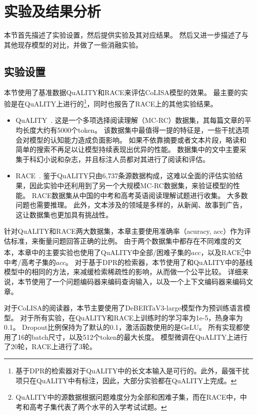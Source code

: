 \section{实验及结果分析}
本节首先描述了实验设置，然后提供实验及其对应结果。
然后又进一步描述了与其他现存模型的对比，并做了一些消融实验。

\subsection{实验设置}
本节使用了基准数据QuALITY和RACE来评估CoLISA模型的效果。
最主要的实验是在QuALITY上进行的\footnote{基于DPR的检索器对于QuALITY中的长文本输入是可行的。此外，最强干扰项只在QuALITY中有标注，因此，大部分实验都在QuALITY上完成。}，同时也报告了RACE上的其他实验结果。

\begin{itemize}
    \item QuALITY~\cite{pang2021quality}. 
        这是一个多项选择阅读理解（MC-RC）数据集，其每篇文章的平均长度大约有5000个token。
        该数据集中最值得一提的特征是，一些干扰选项会对模型的认知能力造成负面影响。
        如果不依靠摘要或者文本片段，略读和简单的搜索不再足以让模型持续表现出优异的性能。
        数据集中的文中主要采集于科幻小说和杂志，并且标注人员都对其进行了阅读和评估。
    \item RACE~\cite{lai2017race}.
        鉴于QuALITY只由6,737条源数据构成，这难以全面的评估实验结果，因此实验中还利用到了另一个大规模MC-RC数据集，来验证模型的性能。
        RACE数据集从中国的中考和高考英语阅读理解试题进行收集。
        大多数问题也需要推理。
        此外，文本涉及的领域是多样的，从新闻、故事到广告，这让数据集也更加具有挑战性。
\end{itemize}

针对QuALITY\cite{pang2021quality}和RACE\cite{lai2017race}两大数据集，本章主要使用准确率（acuracy, acc）作为评估标准，来衡量问题回答正确的比例。
由于两个数据集中都存在不同难度的文本，本章中的主要实验也使用了QuALITY中全部/困难子集的$acc$，以及RACE\footnote{QuALITY中的源数据根据问题难度分为全部和困难子集，而在RACE中，中考和高考子集代表了两个水平的入学考试试题。}中中考/高考子集的$acc$。
对于基于DPR的检索器，本节使用了和QuALITY中的基线模型中的相同的方法，来减缓检索稀疏性的影响，从而做一个公平比较。
详细来说，本节使用了一个问题编码器来编码查询输入，以及一个上下文编码器来编码文章。

对于CoLISA的阅读器，本节主要使用了DeBERTaV3-large模型作为预训练语言模型。
对于所有实验，在QuALITY和RACE上训练时的学习率为1e-5，热身率为0.1。
Dropout比例保持为了默认的0.1，激活函数使用的是GeLU\cite{hendrycks2016gaussian}。
所有实现都使用了16的batch尺寸，以及512个token的最大长度。
模型微调在QuALITY上进行了20轮，RACE上进行了3轮。

